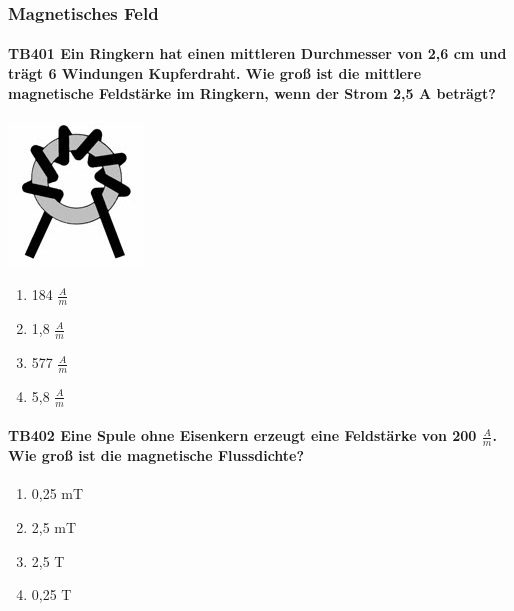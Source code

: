 \documentclass[8pt]{article}
\begin{document}
\begin{enumerate}
\pagebreak
\subsubsection{Magnetisches Feld}

\paragraph*{TB401 Ein Ringkern hat einen mittleren Durchmesser von 2,6 cm und trägt 6 Windungen Kupferdraht. Wie groß ist die mittlere magnetische Feldstärke im Ringkern, wenn der Strom 2,5 A beträgt?}
\begin{center}
	\begin{minipage}{\linewidth}
		\centering
		\includegraphics[scale=0.7]{pics/tb401_a.jpg}
	\end{minipage}
\end{center}
\begin{enumerate}[nolistsep,label=\Alph*]
\item 184 $\frac{A}{m}$
\item 1,8 $\frac{A}{m}$
\item 577 $\frac{A}{m}$
\item 5,8 $\frac{A}{m}$
\end{enumerate}



\paragraph*{TB402 Eine Spule ohne Eisenkern erzeugt eine Feldstärke von 200 $\frac{A}{m}$. Wie groß ist die magnetische Flussdichte?}
\begin{enumerate}[nolistsep,label=\Alph*]
\item 0,25 mT
\item 2,5 mT
\item 2,5 T
\item 0,25 T
\end{enumerate}




\end{enumerate}
\end{document}
